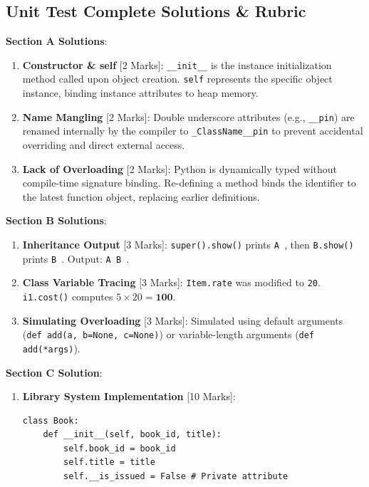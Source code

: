 \subsection{Unit Test Complete Solutions \& Rubric}

\begin{solutionbox}
\noindent\textbf{Section A Solutions}:
\begin{enumerate}
    \item \textbf{Constructor \& self} [2 Marks]: \texttt{\_\_init\_\_} is the instance initialization method called upon object creation. \texttt{self} represents the specific object instance, binding instance attributes to heap memory.
    \item \textbf{Name Mangling} [2 Marks]: Double underscore attributes (e.g., \texttt{\_\_pin}) are renamed internally by the compiler to \texttt{\_ClassName\_\_pin} to prevent accidental overriding and direct external access.
    \item \textbf{Lack of Overloading} [2 Marks]: Python is dynamically typed without compile-time signature binding. Re-defining a method binds the identifier to the latest function object, replacing earlier definitions.
\end{enumerate}

\noindent\textbf{Section B Solutions}:
\begin{enumerate}[start=4]
    \item \textbf{Inheritance Output} [3 Marks]: \texttt{super().show()} prints \texttt{A }, then \texttt{B.show()} prints \texttt{B }. Output: \texttt{A B }.
    \item \textbf{Class Variable Tracing} [3 Marks]: \texttt{Item.rate} was modified to \texttt{20}. \texttt{i1.cost()} computes $5 \times 20 = \mathbf{100}$.
    \item \textbf{Simulating Overloading} [3 Marks]: Simulated using default arguments (\texttt{def add(a, b=None, c=None)}) or variable-length arguments (\texttt{def add(*args)}).
\end{enumerate}

\noindent\textbf{Section C Solution}:
\begin{enumerate}[start=7]
    \item \textbf{Library System Implementation} [10 Marks]:
\begin{lstlisting}[language=Python3]
class Book:
    def __init__(self, book_id, title):
        self.book_id = book_id
        self.title = title
        self.__is_issued = False # Private attribute
        

\end{lstlisting}
\end{enumerate}
\end{solutionbox}
